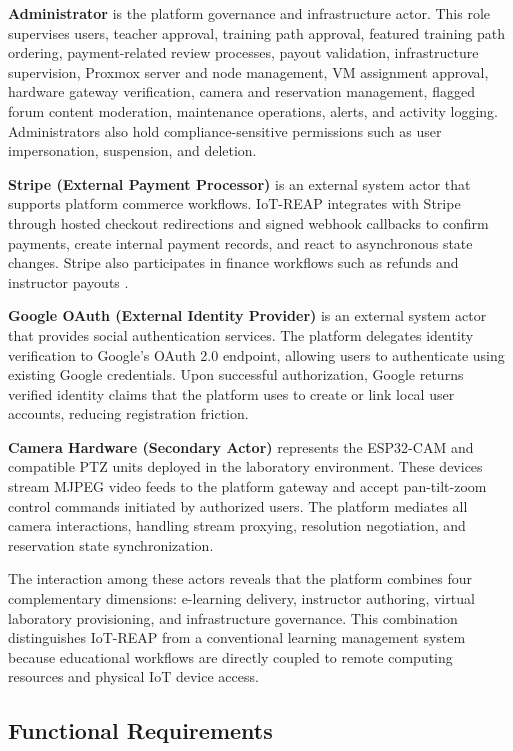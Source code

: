 \textbf{Administrator} is the platform governance and infrastructure actor. This role
supervises users, teacher approval, training path approval, featured training path
ordering, payment-related review processes, payout validation, infrastructure
supervision, Proxmox server and node management, VM assignment approval, hardware
gateway verification, camera and reservation management, flagged forum content
moderation, maintenance operations, alerts, and activity logging. Administrators also
hold compliance-sensitive permissions such as user impersonation, suspension, and
deletion.

\textbf{Stripe (External Payment Processor)} is an external system actor that supports
platform commerce workflows. IoT-REAP integrates with Stripe through hosted checkout
redirections and signed webhook callbacks to confirm payments, create internal payment
records, and react to asynchronous state changes. Stripe also participates in finance
workflows such as refunds and instructor payouts
{\footnotesize\cite{stripe-docs}}.

\textbf{Google OAuth (External Identity Provider)} is an external system actor that
provides social authentication services. The platform delegates identity verification
to Google's OAuth 2.0 endpoint, allowing users to authenticate using existing Google
credentials. Upon successful authorization, Google returns verified identity claims
that the platform uses to create or link local user accounts, reducing registration
friction.

\textbf{Camera Hardware (Secondary Actor)} represents the ESP32-CAM and compatible
PTZ units deployed in the laboratory environment. These devices stream MJPEG video
feeds to the platform gateway and accept pan-tilt-zoom control commands initiated by
authorized users. The platform mediates all camera interactions, handling stream
proxying, resolution negotiation, and reservation state synchronization.

The interaction among these actors reveals that the platform combines four
complementary dimensions: e-learning delivery, instructor authoring, virtual
laboratory provisioning, and infrastructure governance. This combination distinguishes
IoT-REAP from a conventional learning management system because educational workflows
are directly coupled to remote computing resources and physical IoT device access.
\newpage

\subsection{Functional Requirements}

